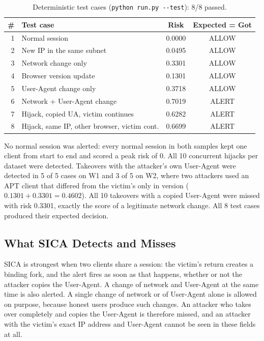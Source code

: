 \documentclass[conference]{IEEEtran}
\begin{document}
\begin{table}[t]
\centering
\caption{Deterministic test cases (\texttt{python run.py -{}-test}): 8/8 passed.}
\label{tab:tests}
\footnotesize
\setlength{\tabcolsep}{3.4pt}
\begin{tabular}{@{}rlcc@{}}
\toprule
\# & Test case & Risk & Expected = Got \\
\midrule
1 & Normal session & 0.0000 & ALLOW \\
2 & New IP in the same subnet & 0.0495 & ALLOW \\
3 & Network change only & 0.3301 & ALLOW \\
4 & Browser version update & 0.1301 & ALLOW \\
5 & User-Agent change only & 0.3718 & ALLOW \\
6 & Network + User-Agent change & 0.7019 & ALERT \\
7 & Hijack, copied UA, victim continues & 0.6282 & ALERT \\
8 & Hijack, same IP, other browser, victim cont. & 0.6699 & ALERT \\
\bottomrule
\end{tabular}
\end{table}

No normal session was alerted: every normal session in both samples kept one
client from start to end and scored a peak risk of 0. All 10 concurrent hijacks
per dataset were detected. Takeovers with the attacker's own User-Agent were
detected in 5 of 5 cases on W1 and 3 of 5 on W2, where two attackers used an APT
client that differed from the victim's only in version ($0.1301+0.3301=0.4602$).
All 10 takeovers with a copied User-Agent were missed with risk 0.3301, exactly
the score of a legitimate network change. All 8 test cases produced their
expected decision.

\subsection{What SICA Detects and Misses}

SICA is strongest when two clients share a session: the victim's return creates
a binding fork, and the alert fires as soon as that happens, whether or not the
attacker copies the User-Agent. A change of network and User-Agent at the same
time is also alerted. A single change of network or of User-Agent alone is
allowed on purpose, because honest users produce such changes. An attacker who
takes over completely and copies the User-Agent is therefore missed, and an
attacker with the victim's exact IP address and User-Agent cannot be seen in
these fields at all.
\end{document}
